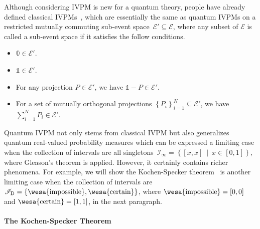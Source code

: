 \documentclass[english,reprint, aps, prl,superscriptaddress, showpacs,
showkeys, longbibliography]{revtex4-1}
\theoremstyle{plain}
\theoremstyle{definition}
\newcommand{\events}{\ensuremath{\mathcal{E}}}
\newcommand{\imposs}{{\mbox{\wesa{impossible}}}}
\newcommand{\necess}{{\mbox{\wesa{certain}}}}
\newcommand{\set}[2]{\ensuremath{\left\{ {#1}~\middle|~{#2}\right\} }}
\begin{document}
Although considering IVPM is new for a quantum theory, people have
already defined classical IVPMs~\cite{JamisonLodwick2004}, which
are essentially the same as quantum IVPMs on a restricted mutually
commuting sub-event space~$\events'\subseteq\events$, where any
subset of $\events$ is called a sub-event space if it satisfies the
follow conditions.
\begin{itemize}
\item $\mathbb{0}\in\events'$.
\item $\mathbb{1}\in\events'$.
\item For any projection $P\in\events'$, we have $\mathbb{1}-P\in\events'$.
\item For a set of mutually orthogonal projections $\left\{ P_{i}\right\} _{i=1}^{N}\subseteq\events'$,
we have $\sum_{i=1}^{N}P_{i}\in\events'$.
\end{itemize}
Quantum IVPM not only stems from classical IVPM but also generalizes
quantum real-valued probability measures which can be expressed a
limiting case when the collection of intervals are 
all singletons~$\mathscr{I}_{\infty}=\set{\left[x,x\right]}{x\in\left[0,1\right]}$,
where Gleason's theorem is applied. However, it certainly contains
richer phenomena. For example, we will show the 
Kochen-Specker theorem~\cite{kochenspecker1967,peres1995quantum,Redhead1987-REDINA}
is another limiting case when the collection of intervals are 
$\mathscr{I}_{\mathrm{D}}=\left\{ \imposs,\necess\right\} $,
where $\imposs=\left[0,0\right]$ and $\necess=\left[1,1\right]$,
in the next paragraph.

\paragraph{The Kochen-Specker Theorem}
\end{document}

